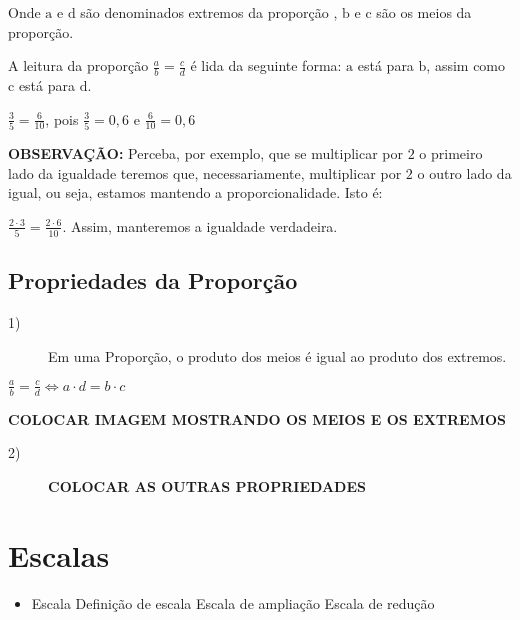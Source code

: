 Onde $\mathrm{a}$ e $\mathrm{d}$ são denominados extremos da proporção , $\mathrm{b}$ e $\mathrm{c}$ são os meios da proporção.

A leitura da proporção  $\frac{a}{b} = \frac{c}{d}$ é lida da seguinte forma: $\mathrm{a}$ está para $\mathrm{b}$, assim como $\mathrm{c}$ está para $\mathrm{d}$.

\begin{example}
    $\frac{3}{5}=\frac{6}{10}$, pois $\frac{3}{5}=0,6$ e $\frac{6}{10}=0,6$
\end{example}

\textbf{OBSERVAÇÃO:} Perceba, por exemplo, que se multiplicar por $2$ o primeiro lado da igualdade teremos que, necessariamente, multiplicar por $2$ o outro lado da igual, ou seja, estamos mantendo a proporcionalidade. Isto é:

\begin{example}
    $\frac{2 \cdot 3}{5}=\frac{2 \cdot 6}{10}$. Assim, manteremos a igualdade verdadeira. 
\end{example}

\subsection{Propriedades da Proporção}
    \begin{description}
    \item[1)] Em uma Proporção, o produto dos meios é igual ao produto dos extremos.
    \end{description}
 
 \begin{center}
    $\frac{a}{b} = \frac{c}{d} \Longleftrightarrow a\cdot d=b \cdot c$ 
 \end{center}   

\textbf{COLOCAR IMAGEM MOSTRANDO OS MEIOS E OS EXTREMOS}
    
    \begin{description}
    \item[2)] \textbf{COLOCAR AS OUTRAS PROPRIEDADES} 
    \end{description}

\section{Escalas}

	\begin{itemize}
		\item Escala
		\subitem Definição de escala 
		\subitem Escala de ampliação
		\subitem Escala de redução
	\end{itemize}

